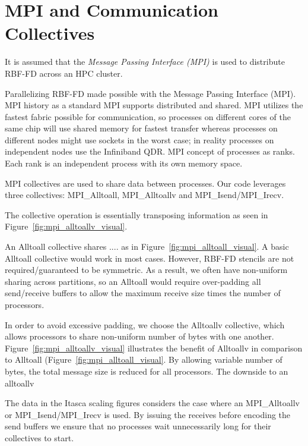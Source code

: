\documentclass{report}
\begin{document}
\section{MPI and Communication Collectives}
\label{sec:mpi_collectives}

It is assumed that the \emph{Message Passing Interface (MPI)} \cite{MPI1993} is used to distribute RBF-FD across an HPC cluster. 


Parallelizing RBF-FD made possible with the Message Passing Interface (MPI). 
MPI history as a standard
MPI supports distributed and shared. 
MPI utilizes the fastest fabric possible for communication, so processes on different cores of the same chip will use shared memory for fastest transfer whereas processes on different nodes might use sockets in the worst case; in reality processes on independent nodes use the Infiniband QDR. 
MPI concept of processes as ranks. Each rank is an independent process with its own memory space. 

MPI collectives are used to share data between processes. Our code leverages three collectives: MPI\_Alltoall, MPI\_Alltoallv and MPI\_Isend/MPI\_Irecv. 

The collective operation is essentially transposing information as seen in Figure~\ref{fig:mpi_alltoallv_visual}. 

An Alltoall collective shares .... as in Figure~\ref{fig:mpi_alltoall_visual}. A basic Alltoall collective would work in most cases. However, RBF-FD stencils are not required/guaranteed to be symmetric. As a result, we often have non-uniform sharing across partitions, so an Alltoall would require over-padding all send/receive buffers to allow the maximum receive size times the number of processors. 

In order to avoid excessive padding, we choose the Alltoallv collective, which allows processors to share non-uniform number of bytes with one another. Figure~\ref{fig:mpi_alltoallv_visual} illustrates the benefit of Alltoallv in comparison to Alltoall (Figure~\ref{fig:mpi_alltoall_visual}. By allowing variable number of bytes, the total message size is reduced for all processors. The downside to an alltoallv




The data in the Itasca scaling figures considers the case where an MPI\_Alltoallv or MPI\_Isend/MPI\_Irecv is used. By issuing the receives before encoding the send buffers we ensure that no processes wait unnecessarily long for their collectives to start.
\end{document}
